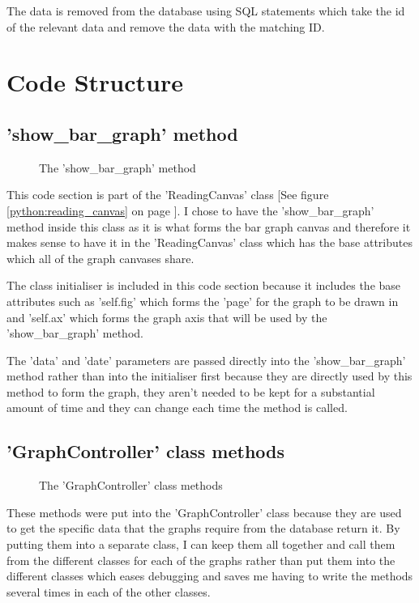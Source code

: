 The data is removed from the database using SQL statements which take the id of the relevant data and remove the data with the matching ID.

\section{Code Structure}

\subsection{'show\_bar\_graph' method}
\begin{figure}[H]
    \caption{The 'show\_bar\_graph' method} \label{python:show_bar_graph_method}
\end{figure}

This code section is part of the 'ReadingCanvas' class [See figure \ref{python:reading_canvas} on page \pageref{python:reading_canvas}]. I chose to have the 'show\_bar\_graph' method inside this class as it is what forms the bar graph canvas and therefore it makes sense to have it in the 'ReadingCanvas' class which has the base attributes which all of the graph canvases share.

The class initialiser is included in this code section because it includes the base attributes such as 'self.fig' which forms the 'page' for the graph to be drawn in and 'self.ax' which forms the graph axis that will be used by the 'show\_bar\_graph' method.

The 'data' and 'date' parameters are passed directly into the 'show\_bar\_graph' method rather than into the initialiser first because they are directly used by this method to form the graph, they aren't needed to be kept for a substantial amount of time and they can change each time the method is called.

\subsection{'GraphController' class methods}

\begin{figure}[H]
    \caption{The 'GraphController' class methods} \label{python:graph_controller_class_methods}
\end{figure}
These methods were put into the 'GraphController' class because they are used to get the specific data that the graphs require from the database return it. By putting them into a separate class, I can keep them all together and call them from the different classes for each of the graphs rather than put them into the different classes which eases debugging and saves me having to write the methods several times in each of the other classes.

